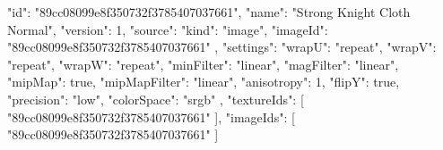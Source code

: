{
  "id": "89cc08099e8f350732f3785407037661",
  "name": "Strong Knight Cloth Normal",
  "version": 1,
  "source": {
    "kind": "image",
    "imageId": "89cc08099e8f350732f3785407037661"
  },
  "settings": {
    "wrapU": "repeat",
    "wrapV": "repeat",
    "wrapW": "repeat",
    "minFilter": "linear",
    "magFilter": "linear",
    "mipMap": true,
    "mipMapFilter": "linear",
    "anisotropy": 1,
    "flipY": true,
    "precision": "low",
    "colorSpace": "srgb"
  },
  "textureIds": [
    "89cc08099e8f350732f3785407037661"
  ],
  "imageIds": [
    "89cc08099e8f350732f3785407037661"
  ]
}
